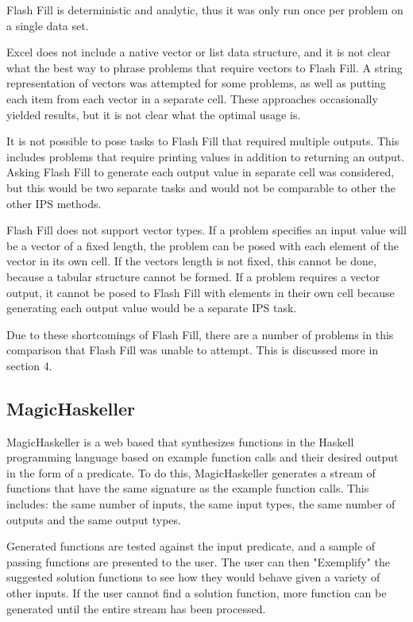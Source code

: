 Flash Fill is deterministic and analytic, thus it was only run once per problem on a single data set.

Excel does not include a native vector or list data structure, and it is not clear what the best way to phrase problems that require vectors to Flash Fill. A string representation of vectors was attempted for some problems, as well as putting each item from each vector in a separate cell. These approaches occasionally yielded results, but it is not clear what the optimal usage is.

It is not possible to pose tasks to Flash Fill that required multiple outputs. This includes problems that require printing values in addition to returning an output. Asking Flash Fill to generate each output value in separate cell was considered, but this would be two separate tasks and would not be comparable to other the other IPS methods.

Flash Fill does not support vector types. If a problem specifies an input value will be a vector of a fixed length, the problem can be posed with each element of the vector in its own cell. If the vectors length is not fixed, this cannot be done, because a tabular structure cannot be formed. If a problem requires a vector output, it cannot be posed to Flash Fill with elements in their own cell because generating each output value would be a separate IPS task.

Due to these shortcomings of Flash Fill, there are a number of problems in this comparison that Flash Fill was unable to attempt. This is discussed more in section 4.

\subsection{MagicHaskeller}

MagicHaskeller is a web based that synthesizes functions in the Haskell programming language based on example function calls and their desired output in the form of a predicate. To do this, MagicHaskeller generates a stream of functions that have the same signature as the example function calls. This includes: the same number of inputs, the same input types, the same number of outputs and the same output types.

Generated functions are tested against the input predicate, and a sample of passing functions are presented to the user. The user can then "Exemplify" the suggested solution functions to see how they would behave given a variety of other inputs. If the user cannot find a solution function, more function can be generated until the entire stream has been processed.

